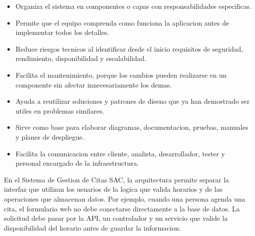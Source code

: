 \documentclass[12pt,letterpaper]{article}
\begin{document}
\begin{itemize}[leftmargin=1.2cm]
    \item Organiza el sistema en componentes o capas con responsabilidades especificas.
    \item Permite que el equipo comprenda como funciona la aplicacion antes de implementar todos los detalles.
    \item Reduce riesgos tecnicos al identificar desde el inicio requisitos de seguridad, rendimiento, disponibilidad y escalabilidad.
    \item Facilita el mantenimiento, porque los cambios pueden realizarse en un componente sin afectar innecesariamente los demas.
    \item Ayuda a reutilizar soluciones y patrones de diseno que ya han demostrado ser utiles en problemas similares.
    \item Sirve como base para elaborar diagramas, documentacion, pruebas, manuales y planes de despliegue.
    \item Facilita la comunicacion entre cliente, analista, desarrollador, tester y personal encargado de la infraestructura.
\end{itemize}

En el Sistema de Gestion de Citas SAC, la arquitectura permite separar la interfaz que utilizan los usuarios de la logica que valida horarios y de las operaciones que almacenan datos. Por ejemplo, cuando una persona agenda una cita, el formulario web no debe conectarse directamente a la base de datos. La solicitud debe pasar por la API, un controlador y un servicio que valide la disponibilidad del horario antes de guardar la informacion.
\end{document}
